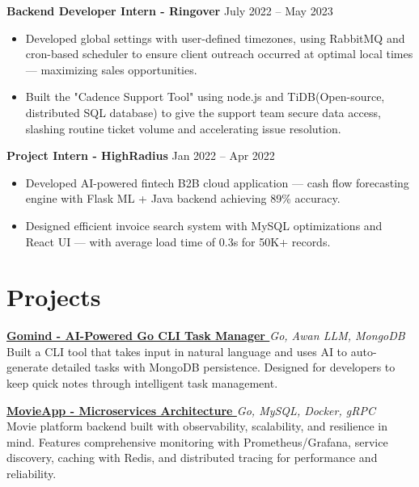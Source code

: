 \documentclass[a4paper,12pt]{article}
\newenvironment{jobshort}[2]
  {%
    \noindent\textbf{#1} \hfill #2 \par
    \begin{itemize}[nosep, leftmargin=1.5em, itemsep=2pt, label=$\bullet$]
  }
  {%
    \end{itemize}
  }
\newenvironment{project}[2]
  {
    \noindent\textbf{#1} \hfill \textit{#2}\\[2pt] %
  }
  {
  }
\begin{document}
\begin{jobshort}
  {Backend Developer Intern - Ringover}               %
  {July 2022 -- May 2023}                  %
   \item Developed global settings with user-defined timezones, using RabbitMQ and cron-based scheduler to ensure client outreach occurred at optimal local times — maximizing sales opportunities.
    \item Built the "Cadence Support Tool" using node.js and TiDB(Open-source, distributed SQL database) to give the support team secure data access, slashing routine ticket volume and accelerating issue resolution.
\end{jobshort}

\begin{jobshort}
  {Project Intern - HighRadius}                        %
  {Jan 2022 -- Apr 2022}                  %
   \item Developed AI-powered fintech B2B cloud application — cash flow forecasting engine with Flask ML + Java backend achieving 89\% accuracy.
\item Designed efficient invoice search system with MySQL optimizations and React UI — with average load time of 0.3s for 50K+ records.
\end{jobshort}
  
\section{Projects}

\begin{project}
    {\href{https://github.com/abhishek622/gomind}{Gomind - AI-Powered Go CLI Task Manager \raisebox{-0.05\height}\faGithub}}
    {Go, Awan LLM, MongoDB}
    Built a CLI tool that takes input in natural language and uses AI to auto-generate detailed tasks with MongoDB persistence. Designed for developers to keep quick notes through intelligent task management.
\end{project}

\begin{project}
    {\href{https://github.com/abhishek622/movieapp}{MovieApp - Microservices Architecture \raisebox{-0.05\height}\faGithub}}
    {Go, MySQL, Docker, gRPC}
    Movie platform backend built with observability, scalability, and resilience in mind. Features comprehensive monitoring with Prometheus/Grafana, service discovery, caching with Redis, and distributed tracing for performance and reliability.
\end{project}
\end{document}
